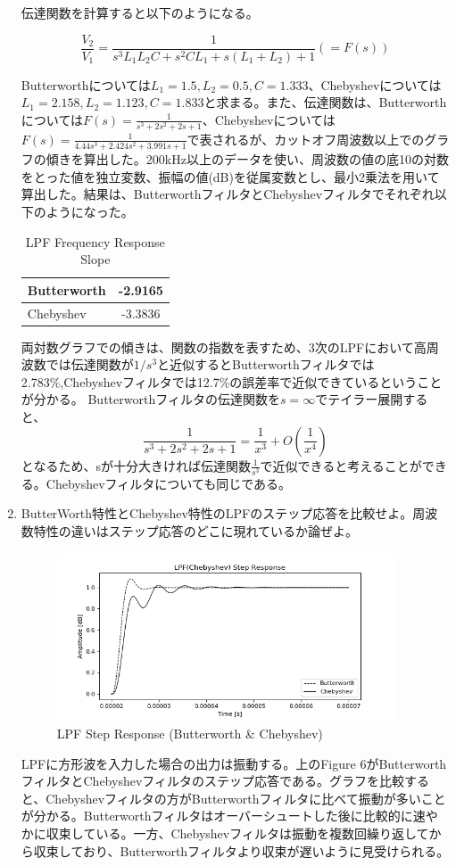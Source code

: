 \documentclass[a4j,dvipdfmx]{article}
\begin{document}
\begin{enumerate}[label={(\arabic*)}]
伝達関数を計算すると以下のようになる。

$$
\frac{V_2}{V_1} = \frac{1}{s^3L_1L_2C+s^2CL_1+s(L_1+L_2)+1}(=F(s))
$$


Butterworthについては$L_1 = 1.5, L_2 = 0.5, C = 1.333$、Chebyshevについては$L_1 = 2.158, L_2 = 1.123, C = 1.833$と求まる。また、伝達関数は、Butterworthについては$F(s)=\frac{1}{s^3+2s^2+2s+1}$、Chebyshevについては$F(s)=\frac{1}{4.44s^3+2.424s^2+3.991s+1}$で表されるが、カットオフ周波数以上でのグラフの傾きを算出した。200kHz以上のデータを使い、周波数の値の底10の対数をとった値を独立変数、振幅の値(dB)を従属変数とし、最小2乗法を用いて算出した。結果は、ButterworthフィルタとChebyshevフィルタでそれぞれ以下のようになった。
\begin{table}[H]
    \begin{center}
        \begin{tabular}{|l|c|} \hline
            Butterworth & -2.9165 \\ \hline
            Chebyshev & -3.3836 \\ \hline
        \end{tabular}
        \caption{LPF Frequency Response Slope}
    \end{center}
\end{table}

両対数グラフでの傾きは、関数の指数を表すため、3次のLPFにおいて高周波数では伝達関数が$1/s^3$と近似するとButterworthフィルタでは2.783\%,Chebyshevフィルタでは12.7\%の誤差率で近似できているということが分かる。
Butterworthフィルタの伝達関数を$s=\infty$でテイラー展開すると、
$$
\frac{1}{s^3+2s^2+2s+1} = \frac{1}{x^3} + O(\frac{1}{x^4})
$$
となるため、sが十分大きければ伝達関数$\frac{1}{s^3}$で近似できると考えることができる。Chebyshevフィルタについても同じである。
\item ButterWorth特性とChebyshev特性のLPFのステップ応答を比較せよ。周波数特性の違いはステップ応答のどこに現れているか論ぜよ。

\begin{figure}[H]
    \begin{center}
     	\includegraphics[width=10cm]{LPF_BC_s.png}
        \caption{LPF Step Response (Butterworth \& Chebyshev)}
    \end{center}
\end{figure}
LPFに方形波を入力した場合の出力は振動する。上のFigure 6がButterworthフィルタとChebyshevフィルタのステップ応答である。グラフを比較すると、Chebyshevフィルタの方がButterworthフィルタに比べて振動が多いことが分かる。Butterworthフィルタはオーバーシュートした後に比較的に速やかに収束している。一方、Chebyshevフィルタは振動を複数回繰り返してから収束しており、Butterworthフィルタより収束が遅いように見受けられる。


\end{enumerate}
\end{document}
